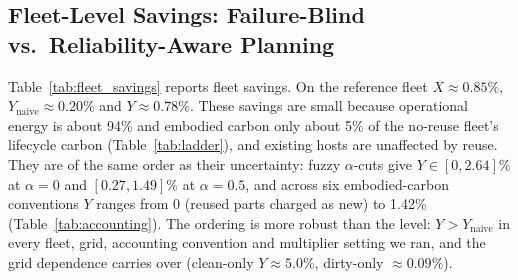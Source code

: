 \documentclass{article} %
\begin{document}
\begin{table}[t]
\caption{Break-even map: the parameter that controls each conclusion, its baseline value, and the value at which the conclusion flips. Values marked $^\ast$ are linear interpolations between swept points, $^\dagger$ first-order derivations holding the replayed plan fixed (Section~\ref{sec:fleet}). Placeholder parameters are marked (P).}
\label{tab:breakeven}
\begin{center}
\small
{}
\end{center}
\end{table}

\subsection{Fleet-Level Savings: Failure-Blind vs.\ Reliability-Aware Planning}
\label{sec:fleet}
Table~\ref{tab:fleet_savings} reports fleet savings. On the reference fleet $X \approx 0.85\%$, $Y_{\text{naive}} \approx 0.20\%$ and $Y \approx 0.78\%$. These savings are small because operational energy is about 94\% and embodied carbon only about 5\% of the no-reuse fleet's lifecycle carbon (Table~\ref{tab:ladder}), and existing hosts are unaffected by reuse. They are of the same order as their uncertainty: fuzzy $\alpha$-cuts give $Y\in[0, 2.64]\%$ at $\alpha=0$ and $[0.27, 1.49]\%$ at $\alpha=0.5$, and across six embodied-carbon conventions $Y$ ranges from 0 (reused parts charged as new) to 1.42\% (Table~\ref{tab:accounting}). The ordering is more robust than the level: $Y > Y_{\text{naive}}$ in every fleet, grid, accounting convention and multiplier setting we ran, and the grid dependence carries over (clean-only $Y \approx 5.0\%$, dirty-only $\approx 0.09\%$).
\end{document}
